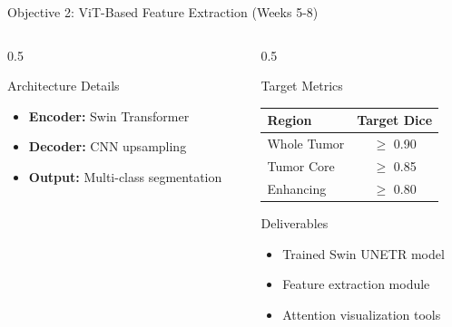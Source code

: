 \documentclass[aspectratio=169]{beamer}
\begin{document}
\begin{frame}{Objective 2: ViT-Based Feature Extraction (Weeks 5-8)}
\begin{columns}
\begin{column}{0.5\textwidth}
            \begin{block}{Architecture Details}
                \begin{itemize}
                    \item \textbf{Encoder:} Swin Transformer
                    \item \textbf{Decoder:} CNN upsampling
                    \item \textbf{Output:} Multi-class segmentation
                \end{itemize}
            \end{block}
        \end{column}
        \begin{column}{0.5\textwidth}
            \begin{block}{Target Metrics}
                \begin{center}
                    \begin{tabular}{lc}
                        \toprule
                        \textbf{Region} & \textbf{Target Dice} \\
                        \midrule
                        Whole Tumor & $\geq$ 0.90 \\
                        Tumor Core & $\geq$ 0.85 \\
                        Enhancing & $\geq$ 0.80 \\
                        \bottomrule
                    \end{tabular}
                \end{center}
            \end{block}
            
            \begin{alertblock}{Deliverables}
                \begin{itemize}
                    \item Trained Swin UNETR model
                    \item Feature extraction module
                    \item Attention visualization tools
                \end{itemize}
            \end{alertblock}
        \end{column}
    \end{columns}
\end{frame}
\end{document}
